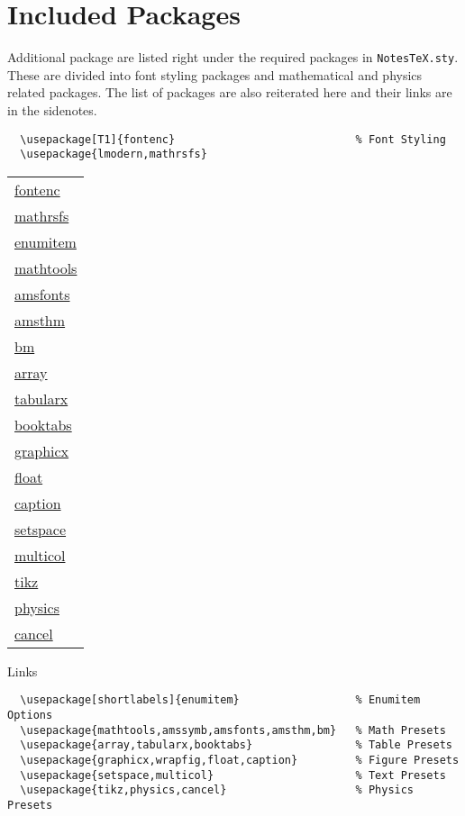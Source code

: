 \section{Included Packages} %
\label{sec:incpackage}
Additional package are listed right under the required packages in \texttt{NotesTeX.sty}. These are divided into font styling packages and mathematical and physics related packages. The list of packages are also reiterated here and their links are in the sidenotes.
\begin{verbatim}
  \usepackage[T1]{fontenc}                            % Font Styling
  \usepackage{lmodern,mathrsfs}
\end{verbatim}
\begin{margintable}\footnotesize 
  \begin{tabularx}{\marginparwidth}{|X}
    \href{https://www.ctan.org/pkg/fontenc}{fontenc}\\
    \href{https://www.ctan.org/pkg/mathrsfs}{mathrsfs}\\
    \href{https://www.ctan.org/pkg/enumitem}{enumitem}\\
    \href{https://www.ctan.org/pkg/mathtools}{mathtools}\\
    \href{https://www.ctan.org/pkg/amsfonts}{amsfonts}\\
    \href{https://www.ctan.org/pkg/amsthm}{amsthm}\\
    \href{https://www.ctan.org/pkg/bm}{bm}\\
    \href{https://www.ctan.org/pkg/array}{array}\\
    \href{https://www.ctan.org/pkg/tabularx}{tabularx}\\
    \href{https://www.ctan.org/pkg/booktabs}{booktabs}\\
    \href{https://www.ctan.org/pkg/graphicx}{graphicx}\\
    \href{https://www.ctan.org/pkg/float}{float}\\
    \href{https://www.ctan.org/pkg/caption}{caption}\\
    \href{https://www.ctan.org/pkg/setspace}{setspace}\\
    \href{https://www.ctan.org/pkg/multicol}{multicol}\\
    \href{https://www.ctan.org/topic/pgf-tikz}{tikz}\\
    \href{https://www.ctan.org/pkg/physics}{physics}\\
    \href{https://www.ctan.org/pkg/cancel}{cancel}
  \end{tabularx}
  \caption{Links}
\end{margintable}
\begin{verbatim}
  \usepackage[shortlabels]{enumitem}                  % Enumitem Options
  \usepackage{mathtools,amssymb,amsfonts,amsthm,bm}   % Math Presets
  \usepackage{array,tabularx,booktabs}                % Table Presets
  \usepackage{graphicx,wrapfig,float,caption}         % Figure Presets
  \usepackage{setspace,multicol}                      % Text Presets
  \usepackage{tikz,physics,cancel}                    % Physics Presets
\end{verbatim}

